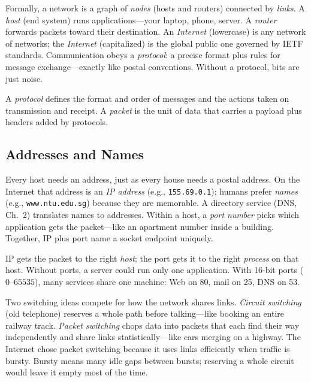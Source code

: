 Formally, a network is a graph of \emph{nodes} (hosts and routers) connected by \emph{links}. A \emph{host} (end system) runs applications---your laptop, phone, server. A \emph{router} forwards packets toward their destination. An \emph{Internet} (lowercase) is any network of networks; the \emph{Internet} (capitalized) is the global public one governed by IETF standards. Communication obeys a \emph{protocol}: a precise format plus rules for message exchange---exactly like postal conventions. Without a protocol, bits are just noise.

\begin{definition}
A \emph{protocol} defines the format and order of messages and the actions taken on transmission and receipt. A \emph{packet} is the unit of data that carries a payload plus headers added by protocols.
\end{definition}

\subsection{Addresses and Names}
Every host needs an address, just as every house needs a postal address. On the Internet that address is an \emph{IP address} (e.g., \texttt{155.69.0.1}); humans prefer \emph{names} (e.g., \texttt{www.ntu.edu.sg}) because they are memorable. A directory service (DNS, Ch.~2) translates names to addresses. Within a host, a \emph{port number} picks which application gets the packet---like an apartment number inside a building. Together, IP plus port name a socket endpoint uniquely.
\begin{remark}
IP gets the packet to the right \emph{host}; the port gets it to the right \emph{process} on that host. Without ports, a server could run only one application. With 16-bit ports ($0$--$65535$), many services share one machine: Web on 80, mail on 25, DNS on 53.
\end{remark}

Two switching ideas compete for how the network shares links. \emph{Circuit switching} (old telephone) reserves a whole path before talking---like booking an entire railway track. \emph{Packet switching} chops data into packets that each find their way independently and share links statistically---like cars merging on a highway. The Internet chose packet switching because it uses links efficiently when traffic is bursty. Bursty means many idle gaps between bursts; reserving a whole circuit would leave it empty most of the time.

